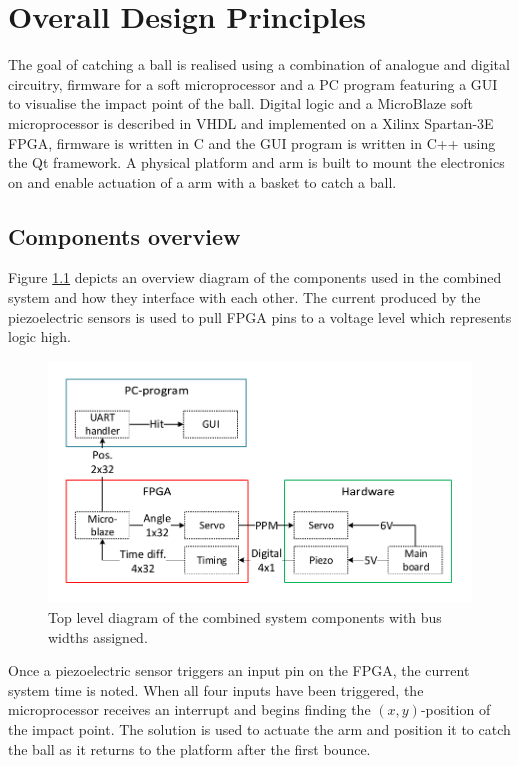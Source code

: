 \chapter{Overall Design Principles} %
\label{chap:overall_design_principles}
The goal of catching a ball is realised using a combination of analogue and digital circuitry, firmware for a soft microprocessor and a PC program featuring a GUI to visualise the impact point of the ball.
Digital logic and a MicroBlaze soft microprocessor is described in VHDL and implemented on a Xilinx Spartan-3E FPGA, firmware is written in C and the GUI program is written in C++ using the Qt framework.
A physical platform and arm is built to mount the electronics on and enable actuation of a arm with a basket to catch a ball.
%
	\section{Components overview}
	Figure \ref{fig:overview} depicts an overview diagram of the components used in the combined system and how they interface with each other.
	The current produced by the piezoelectric sensors is used to pull FPGA pins to a voltage level which represents logic high.
	\begin{figure}[htb]
		\centering
		\includegraphics[width=1\textwidth]{figures/overview}
		\caption{Top level diagram of the combined system components with bus widths assigned.}
		\label{fig:overview}
	\end{figure}
	Once a piezoelectric sensor triggers an input pin on the FPGA, the current system time is noted.
	When all four inputs have been triggered, the microprocessor receives an interrupt and begins finding the $(x,y)$-position of the impact point.
	The solution is used to actuate the arm and position it to catch the ball as it returns to the platform after the first bounce.
	
